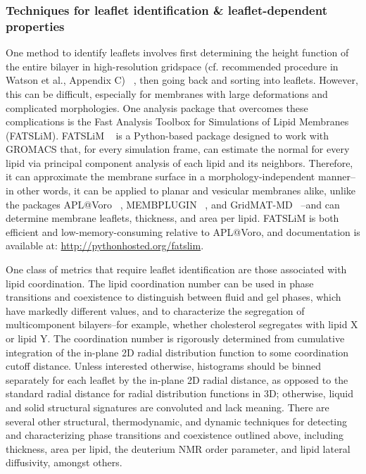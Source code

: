 \documentclass[9pt,bestpractices,pubversion]{livecoms}
\begin{document}
\subsubsection{Techniques for leaflet identification \& leaflet-dependent properties}
\label{subsubsec:leafid-props}
One method to identify leaflets involves first determining the height function of the entire bilayer in high-resolution gridspace (cf. recommended procedure in Watson et al., Appendix C) ~\cite{Watson2011a}, then going back and sorting into leaflets.
However, this can be difficult, especially for membranes with large deformations and complicated morphologies.
One analysis package that overcomes these complications is the Fast Analysis Toolbox for Simulations of Lipid Membranes (FATSLiM).
FATSLiM ~\cite{Buchoux2017} is a Python-based package designed to work with GROMACS that, for every simulation frame, can estimate the normal for every lipid via principal component analysis of each lipid and its neighbors.
Therefore, it can approximate the membrane surface in a morphology-independent manner--in other words, it can be applied to planar and vesicular membranes alike, unlike the packages APL@Voro ~\cite{Lukat2013}, MEMBPLUGIN ~\cite{Guixa-Gonzalez2014a}, and GridMAT-MD ~\cite{Truhlar2009a}--and can determine membrane leaflets, thickness, and area per lipid.
FATSLiM is both efficient and low-memory-consuming relative to APL@Voro, and documentation is available at: \url{http://pythonhosted.org/fatslim}.

One class of metrics that require leaflet identification are those associated with lipid coordination.
The lipid coordination number can be used in phase transitions and coexistence to distinguish between fluid and gel phases, which have markedly different values, and to characterize the segregation of multicomponent bilayers--for example, whether cholesterol segregates with lipid X or lipid Y.
The coordination number is rigorously determined from cumulative integration of the in-plane 2D radial distribution function to some coordination cutoff distance.
Unless interested otherwise, histograms should be binned separately for each leaflet by the in-plane 2D radial distance, as opposed to the standard radial distance for radial distribution functions in 3D; otherwise, liquid and solid structural signatures are convoluted and lack meaning.
There are several other structural, thermodynamic, and dynamic techniques for detecting and characterizing phase transitions and coexistence outlined above, including thickness, area per lipid, the deuterium NMR order parameter, and lipid lateral diffusivity, amongst others.
\end{document}
